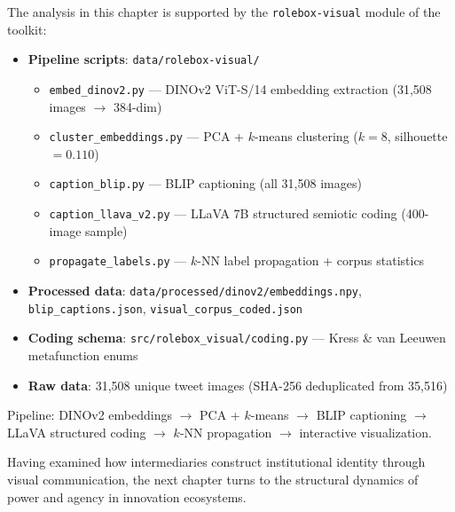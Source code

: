 \documentclass[../main.tex]{subfiles}
\begin{document}
\vspace{0.5em}
\begin{replicationbox}
The analysis in this chapter is supported by the \texttt{rolebox-visual} module of the \RoleBox{} toolkit:
\begin{itemize}[leftmargin=*, itemsep=0.2em]
\item \textbf{Pipeline scripts}: \texttt{data/rolebox-visual/}
  \begin{itemize}[leftmargin=*, itemsep=0.1em]
    \item \texttt{embed\_dinov2.py} --- DINOv2 ViT-S/14 embedding extraction (31,508 images $\to$ 384-dim)
    \item \texttt{cluster\_embeddings.py} --- PCA + $k$-means clustering ($k = 8$, silhouette $= 0.110$)
    \item \texttt{caption\_blip.py} --- BLIP captioning (all 31,508 images)
    \item \texttt{caption\_llava\_v2.py} --- LLaVA 7B structured semiotic coding (400-image sample)
    \item \texttt{propagate\_labels.py} --- $k$-NN label propagation + corpus statistics
  \end{itemize}
\item \textbf{Processed data}: \texttt{data/processed/dinov2/embeddings.npy}, \texttt{blip\_captions.json}, \texttt{visual\_corpus\_coded.json}
\item \textbf{Coding schema}: \texttt{src/rolebox\_visual/coding.py} --- Kress \& van Leeuwen metafunction enums
\item \textbf{Raw data}: 31,508 unique tweet images (SHA-256 deduplicated from 35,516)
\end{itemize}
Pipeline: DINOv2 embeddings $\rightarrow$ PCA + $k$-means $\rightarrow$ BLIP captioning $\rightarrow$ LLaVA structured coding $\rightarrow$ $k$-NN propagation $\rightarrow$ interactive visualization.
\end{replicationbox}

\vspace{1em}
Having examined how intermediaries construct institutional identity through visual communication, the next chapter turns to the structural dynamics of power and agency in innovation ecosystems.
\end{document}
